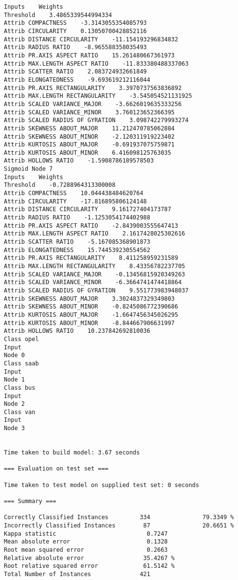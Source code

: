 \documentclass[
	article,			%
	11pt,				%
	oneside,			%
	a4paper,			%
	english,			%
	brazil,				%
	sumario=tradicional
	]{abntex2}
\begin{document}
\begin{lstlisting}
Inputs    Weights
Threshold    3.4865339544994334
Attrib COMPACTNESS    -3.3143055354085793
Attrib CIRCULARITY    0.13050700428852116
Attrib DISTANCE CIRCULARITY    -11.154193296834832
Attrib RADIUS RATIO    -8.965588358035493
Attrib PR.AXIS ASPECT RATIO    15.261480667361973
Attrib MAX.LENGTH ASPECT RATIO    -11.833380488337063
Attrib SCATTER RATIO    2.083724932661849
Attrib ELONGATEDNESS    -9.693619212116044
Attrib PR.AXIS RECTANGULARITY    3.3970737563836892
Attrib MAX.LENGTH RECTANGULARITY    -3.545054521131925
Attrib SCALED VARIANCE_MAJOR    -3.6626019635333256
Attrib SCALED VARIANCE_MINOR    3.760123652366395
Attrib SCALED RADIUS OF GYRATION    3.098742279993274
Attrib SKEWNESS ABOUT_MAJOR    11.212470785062884
Attrib SKEWNESS ABOUT_MINOR    -2.120311919223402
Attrib KURTOSIS ABOUT_MAJOR    -0.691937075759871
Attrib KURTOSIS ABOUT_MINOR    6.416098125763035
Attrib HOLLOWS RATIO    -1.5908786189578503
Sigmoid Node 7
Inputs    Weights
Threshold    -0.7288964313300008
Attrib COMPACTNESS    10.044438484620764
Attrib CIRCULARITY    -17.816895806124148
Attrib DISTANCE CIRCULARITY    9.161727404173787
Attrib RADIUS RATIO    -1.1253054174402988
Attrib PR.AXIS ASPECT RATIO    -2.8439003555647413
Attrib MAX.LENGTH ASPECT RATIO    2.1617428025302616
Attrib SCATTER RATIO    -5.167085368901873
Attrib ELONGATEDNESS    15.744539230554562
Attrib PR.AXIS RECTANGULARITY    8.411258959231589
Attrib MAX.LENGTH RECTANGULARITY    8.43356782237705
Attrib SCALED VARIANCE_MAJOR    -0.13456815920349263
Attrib SCALED VARIANCE_MINOR    -6.3664741474418864
Attrib SCALED RADIUS OF GYRATION    9.551773983948037
Attrib SKEWNESS ABOUT_MAJOR    3.3024837329349803
Attrib SKEWNESS ABOUT_MINOR    -0.8245086772390686
Attrib KURTOSIS ABOUT_MAJOR    -1.6647456345026295
Attrib KURTOSIS ABOUT_MINOR    -8.844667906631997
Attrib HOLLOWS RATIO    10.237842692810036
Class opel
Input
Node 0
Class saab
Input
Node 1
Class bus
Input
Node 2
Class van
Input
Node 3


Time taken to build model: 3.67 seconds

=== Evaluation on test set ===

Time taken to test model on supplied test set: 0 seconds

=== Summary ===

Correctly Classified Instances         334               79.3349 %
Incorrectly Classified Instances        87               20.6651 %
Kappa statistic                          0.7247
Mean absolute error                      0.1328
Root mean squared error                  0.2663
Relative absolute error                 35.4267 %
Root relative squared error             61.5142 %
Total Number of Instances              421     


\end{lstlisting}
\end{document}
